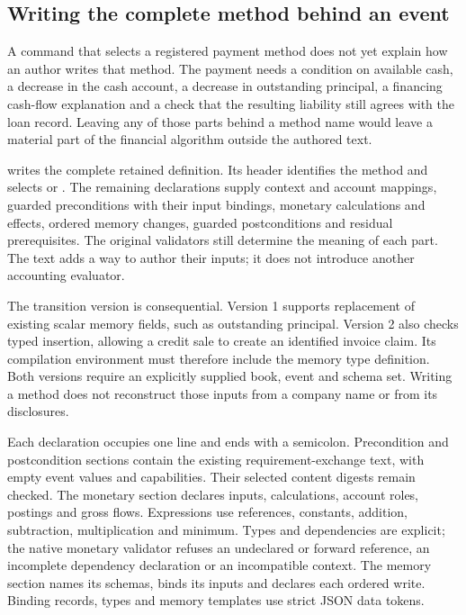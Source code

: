 \subsection{Writing the complete method behind an event}
\label{sec:complete-method-authoring}

A command that selects a registered payment method does not yet explain how an
author writes that method. The payment needs a condition on available cash, a
decrease in the cash account, a decrease in outstanding principal, a financing
cash-flow explanation and a check that the resulting liability still agrees
with the loan record. Leaving any of those parts behind a method name would
leave a material part of the financial algorithm outside the authored text.

 writes the complete retained
 definition. Its header identifies the method and
selects  or . The remaining declarations
supply context and account mappings, guarded preconditions with their input
bindings, monetary calculations and effects, ordered memory changes, guarded
postconditions and residual prerequisites. The original validators still
determine the meaning of each part. The text adds a way to author their inputs;
it does not introduce another accounting evaluator.

The transition version is consequential. Version 1 supports replacement of
existing scalar memory fields, such as outstanding principal. Version 2 also
checks typed insertion, allowing a credit sale to create an identified invoice
claim. Its compilation environment must therefore include the memory type
definition. Both versions require an explicitly supplied book, event and schema
set. Writing a method does not reconstruct those inputs from a company name or
from its disclosures.

Each declaration occupies one line and ends with a semicolon. Precondition and
postcondition sections contain the existing requirement-exchange text, with
empty event values and capabilities. Their selected content digests remain
checked. The monetary section declares inputs, calculations, account roles,
postings and gross flows. Expressions use references, constants, addition,
subtraction, multiplication and minimum. Types and dependencies are explicit;
the native monetary validator refuses an undeclared or forward reference,
an incomplete dependency declaration or an incompatible context. The memory
section names its schemas, binds its inputs and declares each ordered write.
Binding records, types and memory templates use strict JSON data tokens.

